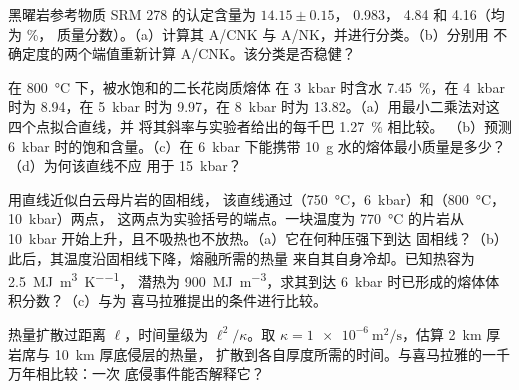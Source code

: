 \begin{exercise}[$\star\star$]\label{exo:b2:crustal-melting:8}
黑曜岩参考物质 SRM 278 的认定含量为 
$14.15 \pm 0.15$， 0.983， 4.84 和  4.16（均为 \unit{\percent}，
质量分数）。（a）计算其 A/CNK 与 A/NK，并进行分类。（b）分别用
 不确定度的两个端值重新计算 A/CNK。该分类是否稳健？
\end{exercise}

\begin{exercise}[$\star\star$]\label{exo:b2:crustal-melting:9}
在 \qty{800}{\celsius} 下，被水饱和的二长花岗质熔体
在 \qty{3}{kbar} 时含水 \qty{7.45}{\percent}，在 \qty{4}{kbar} 时为 8.94，在 \qty{5}{kbar} 时为 9.97，在
\qty{8}{kbar} 时为 13.82。（a）用最小二乘法对这四个点拟合直线，并
将其斜率与实验者给出的每千巴 \qty{1.27}{\percent} 相比较。
（b）预测 \qty{6}{kbar} 时的饱和含量。（c）在 \qty{6}{kbar} 下能携带
\qty{10}{\gram} 水的熔体最小质量是多少？（d）为何该直线不应
用于 \qty{15}{kbar}？
\end{exercise}

\begin{exercise}[$\star\star\star$]\label{exo:b2:crustal-melting:10}
用直线近似白云母片岩的固相线，
该直线通过（\qty{750}{\celsius}，\qty{6}{kbar}）和（\qty{800}{\celsius}，\qty{10}{kbar}）两点，
这两点为实验括号的端点。一块温度为 \qty{770}{\celsius} 的片岩从
\qty{10}{kbar} 开始上升，且不吸热也不放热。（a）它在何种压强下到达
固相线？（b）此后，其温度沿固相线下降，熔融所需的热量
来自其自身冷却。已知热容为 \qty{2.5}{\mega\joule\per\cubic\metre\per\kelvin}，
潜热为 \qty{900}{\mega\joule\per\cubic\metre}，求其到达
\qty{6}{kbar} 时已形成的熔体体积分数？（c）与为
喜马拉雅提出的条件进行比较。
\end{exercise}

\begin{exercise}[$\star\star\star$]\label{exo:b2:crustal-melting:11}
热量扩散过距离 $\ell$，时间量级为 $\ell^2/\kappa$。取
$\kappa = \qty{1e-6}{\square\metre\per\second}$，估算
\qty{2}{km} 厚岩席与 \qty{10}{km} 厚底侵层的热量，
扩散到各自厚度所需的时间。与喜马拉雅的一千万年相比较：一次
底侵事件能否解释它？
\end{exercise}

